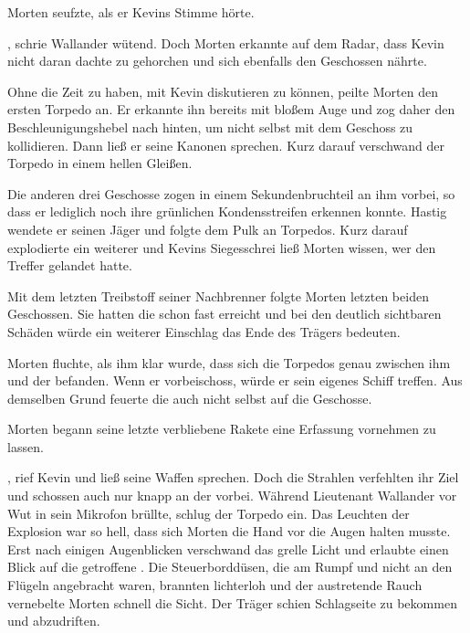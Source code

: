 \par

Morten seufzte, als er Kevins Stimme hörte. 

\par

, schrie Wallander wütend. Doch Morten erkannte auf dem Radar, dass Kevin nicht daran dachte zu gehorchen und sich ebenfalls den Geschossen nährte.

\par

Ohne die Zeit zu haben, mit Kevin diskutieren zu können, peilte Morten den ersten Torpedo an. Er erkannte ihn bereits mit bloßem Auge und zog daher den Beschleunigungshebel nach hinten, um nicht selbst mit dem Geschoss zu kollidieren. Dann ließ er seine Kanonen sprechen. Kurz darauf verschwand der Torpedo in einem hellen Gleißen.

\par

Die anderen drei Geschosse zogen in einem Sekundenbruchteil an ihm vorbei, so dass er lediglich noch ihre grünlichen Kondensstreifen erkennen konnte. Hastig wendete er seinen Jäger und folgte dem Pulk an Torpedos. Kurz darauf explodierte ein weiterer und Kevins Siegesschrei ließ Morten wissen, wer den Treffer gelandet hatte.

\par

Mit dem letzten Treibstoff seiner Nachbrenner folgte Morten letzten beiden Geschossen. Sie hatten die  schon fast erreicht und bei den deutlich sichtbaren Schäden würde ein weiterer Einschlag das Ende des Trägers bedeuten.

\par

Morten fluchte, als ihm klar wurde, dass sich die Torpedos genau zwischen ihm und der  befanden. Wenn er vorbeischoss, würde er sein eigenes Schiff treffen. Aus demselben Grund feuerte die  auch nicht selbst auf die Geschosse.

\par

Morten begann seine letzte verbliebene Rakete eine Erfassung vornehmen zu lassen.

\par

, rief Kevin und ließ seine Waffen sprechen. Doch die Strahlen verfehlten ihr Ziel und schossen auch nur knapp an der  vorbei. Während Lieutenant Wallander vor Wut in sein Mikrofon brüllte, schlug der Torpedo ein. Das Leuchten der Explosion war so hell, dass sich Morten die Hand vor die Augen halten musste. Erst nach einigen Augenblicken verschwand das grelle Licht und erlaubte einen Blick auf die getroffene . Die Steuerborddüsen, die am Rumpf und nicht an den Flügeln angebracht waren, brannten lichterloh und der austretende Rauch vernebelte Morten schnell die Sicht. Der Träger schien Schlagseite zu bekommen und abzudriften.

